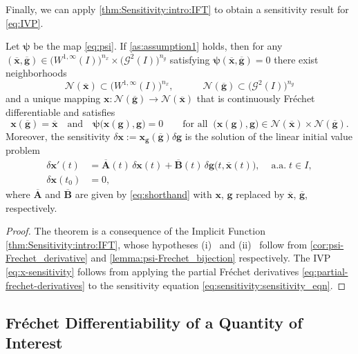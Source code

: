 \documentclass[onefignum,onetabnum]{siamart220329}
\numberwithin{equation}{section}
\newcommand{\aall}{\mbox{ a.a.} \;}
\newcommand{\bg}{\ensuremath{\mathbf{g}}} %
\newcommand{\bx}{\ensuremath{\mathbf{x}}} %
\newcommand {\bpsi} {\boldsymbol{\psi}}
\newcommand{\BA}{\ensuremath{\mathbf{A}} } %
\newcommand{\BB}{\ensuremath{\mathbf{B}} } %
\newcommand {\cG} {\mathcal{G}}
\newcommand {\cN} {\mathcal{N}}
\newcommand{\WW}{\big( W^{1, \infty}(I) \big)^{n_x}}
\begin{document}
Finally, we can apply \cref{thm:Sensitivity:intro:IFT} to obtain a sensitivity result for \cref{eq:IVP}.
\begin{theorem} \label{thm:sensitivity_result}
        Let $\bpsi$ be the map  \cref{eq:psi}.  If \cref{as:assumption1}  holds, then for any 
	$(\overline{\bx}, \overline{\bg}) \in \WW \times \big(\cG^2(I)\big)^{n_g}$ 
	satisfying $\bpsi(\overline{\bx}, \overline{\bg}) = 0$ there exist neighborhoods 
	\[
	       \cN(\overline{\bx}) \subset  \WW, \qquad \quad 
	       \cN(\overline{\bg}) \subset \big(\cG^2(I)\big)^{n_g}
	\]
	and a unique mapping $\bx : \cN(\overline{\bg}) \rightarrow \cN(\overline{\bx})$ that is continuously Fr\'echet differentiable and satisfies
	\[
		\bx(\overline{\bg}) = \overline{\bx} \quad \mbox{and} \quad
		\bpsi\big(\bx(\bg), \bg \big) = 0 \qquad \mbox{for all } \ \big(\bx(\bg), \bg\big) \in \cN(\overline{\bx}) \times \cN(\overline{\bg}).
	\]
	Moreover, the sensitivity $\delta \bx := \bx_\bg(\overline{\bg}) \delta \bg$ is the solution of the linear initial value problem
	\begin{equation}    \label{eq:x-sensitivity}
	\begin{aligned}
		\delta \bx'(t) &= \overline{\BA}(t) \, \delta \bx(t) +\overline{\BB}(t) \, \delta \bg\big(t,  \overline{\bx}(t) \big), & \aall t \in I, \\
		\delta \bx(t_0) &= 0,
	\end{aligned}
	\end{equation}
	where $\overline{\BA}$ and $\overline{\BB}$ are given by \cref{eq:shorthand} with $\bx$, $\bg$ replaced by $\overline{\bx}$,
	$\overline{\bg}$, respectively.
\end{theorem}
\begin{proof}
	The theorem is a consequence of the Implicit Function \cref{thm:Sensitivity:intro:IFT}, whose hypotheses (i) \ and (ii) \ follow from \cref{cor:psi-Frechet_derivative} and
	\cref{lemma:psi-Frechet_bijection} respectively. The IVP \cref{eq:x-sensitivity} follows from applying the partial Fr\'echet derivatives \cref{eq:partial-frechet-derivatives} to the sensitivity equation \cref{eq:sensitivity:sensitivity_eqn}.
\end{proof}






\subsection{Fr\'echet Differentiability of a Quantity of Interest} \label{sec:frechet-differentiability-adjoints}
\end{document}
